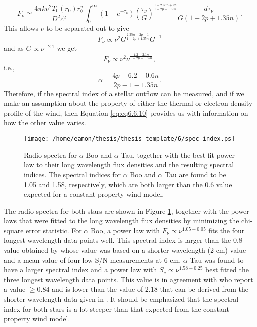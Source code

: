 \begin{equation}
F_{\nu} \simeq \frac{4\pi k\nu^2T_{0}(r_{0})r_{0}^{n}}{D^2c^2}\int ^{\infty}_{0}(1-e^{-\tau _{\nu}})\left(\frac{\tau _{\nu}}{G} \right)^{\frac{1-2.35n +2p}{1-2p +1.35n}}\frac{d\tau _{\nu}}{G(1-2p + 1.35n)}.
\label{eq:eq6.6.7}
\end{equation}
This allows $\nu$ to be separated out to give
\begin{equation}
F_{\nu} \propto \nu^2 G^{\frac{2.35n -2p -1}{1-2p +1.35n}} G^{-1}
\label{eq:eq6.6.8}
\end{equation}
and as $G \propto \nu^{-2.1}$ we get
\begin{equation}
F_{\nu} \propto \nu^2 \nu^{\frac{4.2-2.1n}{1-2p +1.35n}},
\label{eq:eq6.6.9}
\end{equation}
i.e.,
\begin{equation}
\alpha = \frac{4p -6.2 -0.6n}{2p-1-1.35n}.
\label{eq:eq6.6.10}
\end{equation}
Therefore, if the spectral index of a stellar outflow can be measured, and if we make an assumption about the property of either the thermal or electron density profile of the wind, then Equation \ref{eq:eq6.6.10} provides us with information on how the other value varies.

\begin{figure}[hbt!]
\centering 
          \texttt{[image: /home/eamon/thesis/thesis\_template/6/spec\_index.ps]}
\caption[Power law fits to the spectra of $\alpha$ Boo and $\alpha$ Tau.]{Radio spectra for $\alpha$ Boo and $\alpha$ Tau, together with the best fit power law to their long wavelength flux densities and the resulting spectral indices. The spectral indices for $\alpha$ Boo and $\alpha$ Tau are found to be 1.05 and 1.58, respectively, which are both larger than the 0.6 value expected for a constant property wind model.}
\label{fig6.6.1}
\end{figure}

The radio spectra for both stars are shown in Figure \ref{fig6.6.1}, together with the power laws that were fitted to the long wavelength flux densities by minimizing the chi-square error statistic. For $\alpha$ Boo, a power law with $F_{\nu} \propto \nu ^{1.05 \pm 0.05}$ fits the four longest wavelength data points well. This spectral index is larger than the 0.8 value obtained by \cite{drake_1986} whose value was based on a shorter wavelength (2 cm) value and a mean value of four low S/N measurements at 6 cm. $\alpha$ Tau was found to have a larger spectral index and a power law with $S_{\nu} \propto \nu ^{1.58 \pm 0.25}$ best fitted the three longest wavelength data points. This value is in agreement with \cite{drake_1986} who report a value $\ge 0.84$ and is lower than the value of 2.18 that can be derived from the shorter wavelength data given in \cite{wood_2007}. It should be emphasized that the spectral index for both stars is a lot steeper than that expected from the constant property wind model. 

